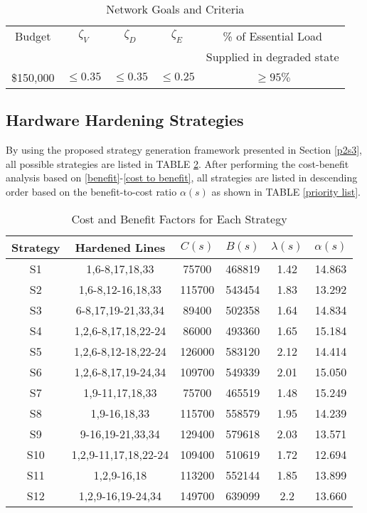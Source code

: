 \documentclass[conference]{IEEEtran}
\begin{document}
\begin{table}[!htb]
\centering
\caption{\label{goal indxes} Network Goals and Criteria}
\begin{tabular}{c c c c c}
\hline
    Budget & $\zeta_V$ & $\zeta_D$ & $\zeta_E$ & \% of Essential Load \\
     & & & & Supplied in degraded state\\ [0.5ex]
    \hline
    \$150,000 & $\leq 0.35$ & $\leq 0.35$ & $\leq 0.25$ & $\geq 95\%$ \\
    \hline
\end{tabular}
\end{table}
\subsection{Hardware Hardening Strategies}
By using the proposed strategy generation framework presented in Section \ref{p2s3}, all possible strategies are listed in TABLE \ref{cost benefit list}.
After performing the cost-benefit analysis based on \eqref{benefit}-\eqref{cost to benefit}, all strategies are listed in descending order based on the benefit-to-cost ratio $\alpha(s)$ as shown in TABLE \ref{priority list}. \begin{table}[!htb]
\centering
\caption{\label{cost benefit list}Cost and Benefit Factors for Each Strategy}
\begin{tabular}{c c c c c c}
\hline
    Strategy & Hardened Lines & $C(s)$ & $B(s)$ & $\lambda(s)$ & $\alpha(s)$ \\
    \hline 
    S1 &1,6-8,17,18,33& 75700 & 468819 & 1.42 & 14.863\\
    S2 &1,6-8,12-16,18,33 &115700 & 543454 & 1.83 & 13.292\\
    S3 &6-8,17,19-21,33,34 &89400 & 502358 & 1.64 & 14.834\\
    S4 &1,2,6-8,17,18,22-24 &86000 & 493360 & 1.65 & 15.184\\
    S5 &1,2,6-8,12-18,22-24 &126000 & 583120 & 2.12 & 14.414\\
    S6 &1,2,6-8,17,19-24,34& 109700 & 549339 & 2.01 & 15.050\\
    S7 &1,9-11,17,18,33& 75700 & 465519 & 1.48 & 15.249\\
    S8 &1,9-16,18,33 &115700 & 558579 & 1.95 & 14.239\\
    S9 &9-16,19-21,33,34 &129400 & 579618 & 2.03 & 13.571\\
    S10 &1,2,9-11,17,18,22-24 &109400 & 510619 & 1.72 & 12.694\\
    S11 &1,2,9-16,18 &113200 & 552144 & 1.85 & 13.899\\
    S12 &1,2,9-16,19-24,34 &149700 & 639099 & 2.2 & 13.660\\
\hline
\end{tabular}
\end{table} 
\end{document}
